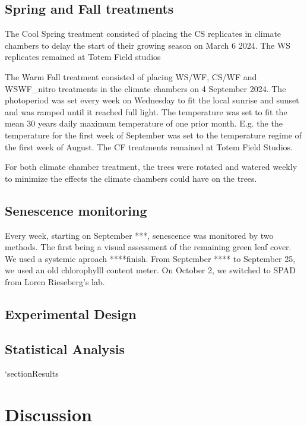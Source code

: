 \documentclass{article}
\begin{document}
\subsection{Spring and Fall treatments}
The Cool Spring treatment consisted of placing the CS replicates in climate chambers to delay the start of their growing season on March 6 2024. The WS replicates remained at Totem Field studios
\par The Warm Fall treatment consisted of placing WS/WF, CS/WF and WSWF\_nitro treatments in the climate chambers on 4 September 2024. The photoperiod was set every week on Wednesday to fit the local sunrise and sunset and was ramped until it reached full light. The temperature was set to fit the mean 30 years daily maximum temperature of one prior month. E.g. the the temperature for the first week of September was set to the temperature regime of the first week of August. The CF treatments remained at Totem Field Studios. 
\par For both climate chamber treatment, the trees were rotated and watered weekly to minimize the effects the climate chambers could have on the trees.

\subsection  {Senescence monitoring}
Every week, starting on September ***, senescence was monitored by two methods. The first being a visual assessment of the remaining green leaf cover. We used a systemic aproach ****finish.
From September **** to September 25, we used an old chlorophylll content meter. On October 2, we switched to SPAD from Loren Rieseberg's lab. 

\subsection{Experimental Design}

\subsection{Statistical Analysis}
`section{Results}
\section{Discussion}

\printbibliography
\end{document}
